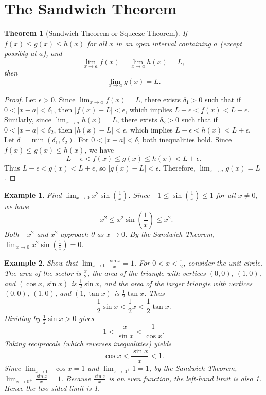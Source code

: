\documentclass[11pt,a4paper]{article}
\newtheorem{example}{Example}
\newtheorem{theorem}{Theorem}
\begin{document}
\section{The Sandwich Theorem}
\begin{theorem}[Sandwich Theorem or Squeeze Theorem]
If $f(x) \leq g(x) \leq h(x)$ for all $x$ in an open interval containing $a$ (except possibly at $a$), and
\[
\lim_{x \to a} f(x) = \lim_{x \to a} h(x) = L,
\]
then
\[
\lim_{x \to a} g(x) = L.
\]
\end{theorem}
\begin{proof}
Let $\epsilon > 0$. Since $\lim_{x \to a} f(x) = L$, there exists $\delta_1 > 0$ such that if $0 < |x - a| < \delta_1$, then $|f(x) - L| < \epsilon$, which implies $L - \epsilon < f(x) < L + \epsilon$. Similarly, since $\lim_{x \to a} h(x) = L$, there exists $\delta_2 > 0$ such that if $0 < |x - a| < \delta_2$, then $|h(x) - L| < \epsilon$, which implies $L - \epsilon < h(x) < L + \epsilon$. Let $\delta = \min(\delta_1, \delta_2)$. For $0 < |x - a| < \delta$, both inequalities hold. Since $f(x) \leq g(x) \leq h(x)$, we have
\[
L - \epsilon < f(x) \leq g(x) \leq h(x) < L + \epsilon.
\]
Thus $L - \epsilon < g(x) < L + \epsilon$, so $|g(x) - L| < \epsilon$. Therefore, $\lim_{x \to a} g(x) = L$.
\end{proof}
\begin{example}
Find $\displaystyle \lim_{x \to 0} x^2 \sin\left(\frac{1}{x}\right)$.
Since $-1 \leq \sin\left(\frac{1}{x}\right) \leq 1$ for all $x \neq 0$, we have
\[
-x^2 \leq x^2 \sin\left(\frac{1}{x}\right) \leq x^2.
\]
Both $-x^2$ and $x^2$ approach 0 as $x \to 0$. By the Sandwich Theorem, $\lim_{x \to 0} x^2 \sin\left(\frac{1}{x}\right) = 0$.
\end{example}
\begin{example}
Show that $\displaystyle \lim_{x \to 0} \frac{\sin x}{x} = 1$.
For $0 < x < \frac{\pi}{2}$, consider the unit circle. The area of the sector is $\frac{x}{2}$, the area of the triangle with vertices $(0,0)$, $(1,0)$, and $(\cos x, \sin x)$ is $\frac{1}{2}\sin x$, and the area of the larger triangle with vertices $(0,0)$, $(1,0)$, and $(1, \tan x)$ is $\frac{1}{2}\tan x$. Thus
\[
\frac{1}{2}\sin x < \frac{1}{2}x < \frac{1}{2}\tan x.
\]
Dividing by $\frac{1}{2}\sin x > 0$ gives
\[
1 < \frac{x}{\sin x} < \frac{1}{\cos x}.
\]
Taking reciprocals (which reverses inequalities) yields
\[
\cos x < \frac{\sin x}{x} < 1.
\]
Since $\lim_{x \to 0^+} \cos x = 1$ and $\lim_{x \to 0^+} 1 = 1$, by the Sandwich Theorem, $\lim_{x \to 0^+} \frac{\sin x}{x} = 1$. Because $\frac{\sin x}{x}$ is an even function, the left-hand limit is also 1. Hence the two-sided limit is 1.
\end{example}
\end{document}
